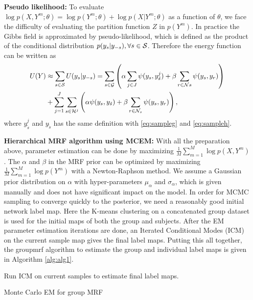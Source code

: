 \documentclass[runningheads,a4paper]{llncs}
\begin{document}
\noindent \textbf{Pseudo likelihood: } To evaluate $\log p(X,Y^m;\theta) = \log
p(Y^m;\theta) + \log p(X|Y^m;\theta)$ as a function of $\theta$, we face the
difficulty of evaluating the partition function $Z$ in $p(Y^m)$.  In practice the
Gibbs field is approximated by pseudo-likelihood, which is defined as the
product of the conditional distribution $p(y_s|y_{-s}), \forall s \in
\mathcal{S}$. Therefore the energy function can be written as
\begin{align*}
U(Y) &\approx  \sum_{s\in\mathcal{S}} U(y_s | y_{-s}) = \sum_{s\in\mathcal{G}} \left ( \alpha \sum_{j\in J} \psi(y_s,y_{\tilde s}^j) +\beta\sum_{r\in \mathcal{N}{s}} \psi(y_s, y_r) \right ) \\
&+ \sum_{j=1}^J \sum_{s\in\mathcal{H}^j} \left (\alpha \psi(y_s, y_{\tilde s}) + \beta \sum_{r\in \mathcal{N}_s} \psi(y_s, y_r) \right ),
\end{align*}
where $y_{\tilde s}^j$ and $y_{\tilde s}$ has the same definition with \eqref{eq:sampleg} and \eqref{eq:sampleh}.

\noindent\textbf{Hierarchical MRF algorithm using MCEM: } With all the
preparation above, parameter estimation can be done by maximizing
$\frac{1}{M}\sum_{m=1}^M\log p (X, Y^m)$. The $\alpha$ and $\beta$ in the MRF
prior can be optimized by maximizing $\frac{1}{M}\sum_{m=1}^M\log p (Y^m)$ with
a Newton-Raphson method. We assume a Gaussian prior distribution on $\alpha$
with hyper-parameters $\mu_{\alpha}$ and $\sigma_{\alpha}$, which is given manually and does not have significant impact on the model. In order for MCMC
sampling to converge quickly to the posterior, we need a reasonably good initial network label map. Here the K-means clustering on a concatenated group dataset
is used for the initial maps of both the group and subjects. After the EM
parameter estimation iterations are done, an Iterated Conditional Modes (ICM) on
the current sample map gives the final label maps. Putting this all together,
the \textsf{groupmrf} algorithm to estimate the group and individual label maps
is given in Algorithm \ref{alg:alg1}.
\vspace*{-16pt}
\begin{algorithm}[htb]
  \label{alg:alg1}
  Run ICM on current samples to estimate final label maps.
  \caption{Monte Carlo EM for group MRF}
\end{algorithm}
\vspace*{-20pt}
\end{document}
